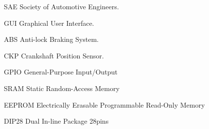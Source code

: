 \begin{siglas}
  \item[SAE] Society of Automotive Engineers.
  \item[GUI] Graphical User Interface.
  \item[ABS] Anti-lock Braking System.
  \item[CKP] Crankshaft Position Sensor.
  \item[GPIO] General-Purpose Input/Output
  \item[SRAM] Static Random-Access Memory
  \item[EEPROM] Electrically Erasable Programmable Read-Only Memory
  \item[DIP28] Dual In-line Package 28pins
\end{siglas}